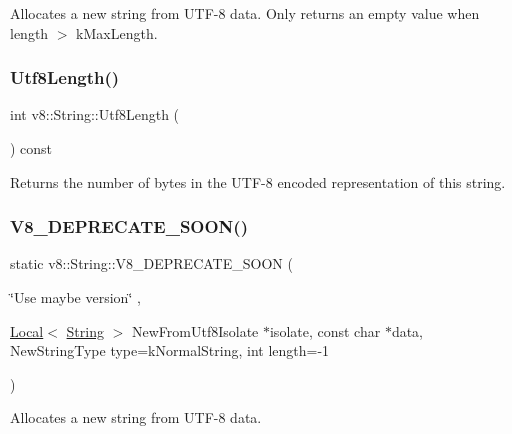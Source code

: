 Allocates a new string from U\+T\+F-\/8 data. Only returns an empty value when length $>$ k\+Max\+Length. \mbox{\label{classv8_1_1String_a03010150464f91fdabb73c837bf41706}} 
\subsubsection{\texorpdfstring{Utf8\+Length()}{Utf8Length()}}
{\footnotesize\ttfamily int v8\+::\+String\+::\+Utf8\+Length (\begin{DoxyParamCaption}{ }\end{DoxyParamCaption}) const}

Returns the number of bytes in the U\+T\+F-\/8 encoded representation of this string. \mbox{\label{classv8_1_1String_aa9d64688e3535b3daabafcc46a59ce5a}} 
\subsubsection{\texorpdfstring{V8\+\_\+\+D\+E\+P\+R\+E\+C\+A\+T\+E\+\_\+\+S\+O\+O\+N()}{V8\_DEPRECATE\_SOON()}\hspace{0.1cm}{\footnotesize\ttfamily [1/3]}}
{\footnotesize\ttfamily static v8\+::\+String\+::\+V8\+\_\+\+D\+E\+P\+R\+E\+C\+A\+T\+E\+\_\+\+S\+O\+ON (\begin{DoxyParamCaption}\item[{\char`\"{}Use maybe version\char`\"{}}]{,  }\item[{\mbox{\hyperlink{classv8_1_1Local}{Local}}$<$ \mbox{\hyperlink{classv8_1_1String}{String}} $>$ }]{New\+From\+Utf8Isolate $\ast$isolate, const char $\ast$data, New\+String\+Type type=k\+Normal\+String, int length=-\/1 }\end{DoxyParamCaption})\hspace{0.3cm}{\ttfamily [static]}}

Allocates a new string from U\+T\+F-\/8 data. \mbox{\label{classv8_1_1String_aeab948105979e2ffd61eb552b0da4e50}} 
